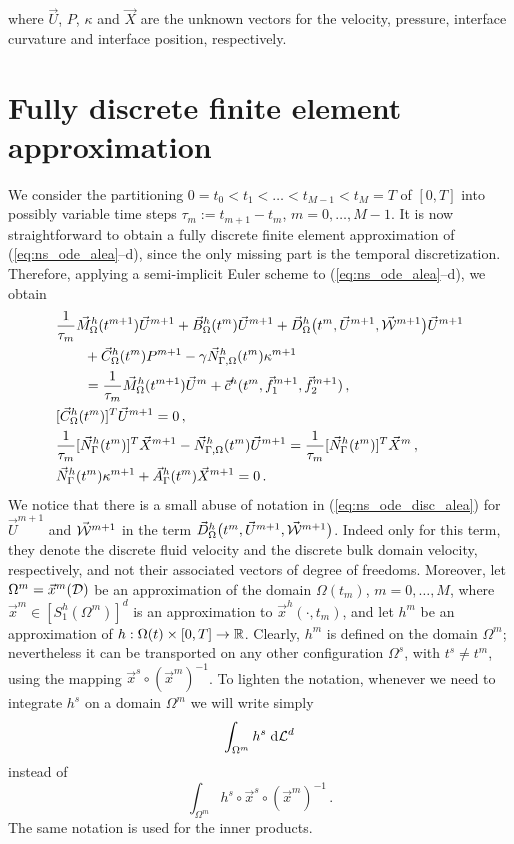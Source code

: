 where $\vec U$, $P$, $\kappa$ and $\vec X$ are the unknown vectors for the
velocity, pressure, interface curvature and interface position, respectively.

\section{Fully discrete finite element approximation}\label{sec:ale_fem}
We consider the partitioning  $0= t_0 < t_1 < \ldots < t_{M-1} < t_M = T$ of
$[0,T]$ into possibly variable time steps $\tau_m := t_{m+1}-t_m$, $m=0, \ldots,
M-1$. It is now straightforward to obtain a fully discrete finite element
approximation of (\ref{eq:ns_ode_alea}--d), since the only missing part is the
temporal discretization. Therefore, applying a semi-implicit Euler scheme to
(\ref{eq:ns_ode_alea}--d), we obtain
\begin{subequations}
\begin{align}
& \frac{1}{\tau_m}\vec M^h_\Omega(t^{m+1})\vec U^{m+1} +
\vec B^h_\Omega(t^m) \vec U^{m+1} +
\vec D^h_\Omega\big(t^m,\vec U^{m+1},\vec{\mathcal W}^{m+1}\big)\vec U^{m+1} \nonumber \\
& \qquad + \vec C^h_\Omega(t^m) P^{m+1}
- \gamma \vec{N}_{\Gamma,\Omega}^h(t^m) \kappa^{m+1} \nonumber \\
& \qquad = \frac{1}{\tau_m} \vec M^h_\Omega(t^{m+1})\vec U^m
+ \vec c^h(t^m,\vec f_1^{m+1},\vec f_2^{m+1})\,,\label{eq:ns_ode_disc_alea} \\
& [\vec C^h_\Omega(t^m) ]^T \vec U^{m+1} = 0\,,
\label{eq:ns_ode_disc_aleb} \\
& \frac{1}{\tau_m}[\vec N_\Gamma^h(t^m)]^T \vec X^{m+1}
- \vec{N}_{\Gamma,\Omega}^h(t^m)\vec U^{m+1} = \frac{1}{\tau_m}[\vec N_\Gamma^h(t^m)]^T
\vec X^m\,, \label{eq:ns_ode_disc_alec}\\
& \vec N_\Gamma^h(t^m) \kappa^{m+1} + \vec A^h_\Gamma(t^m)\vec X^{m+1}
 = 0\,. \label{eq:ns_ode_disc_aled}
\end{align}
\end{subequations}
We notice that there is a small abuse of notation in (\ref{eq:ns_ode_disc_alea})
for $\vec U^{m+1}$ and $\vec{\mathcal W}^{m+1}$ in the term $\vec D^h_\Omega\big(t^{m},\vec
U^{m+1},\vec{\mathcal W}^{m+1}\big)$. Indeed only for this term, they denote the discrete
fluid velocity and the discrete bulk domain velocity, respectively, and not
their associated vectors of degree of freedoms. Moreover, let
$\Omega^m=\vec x^m(\mathcal D)$ be an approximation of the domain $\Omega(t_m)$, $m=0
,\ldots, M$, where $\vec x^m \in [S^h_1(\Omega^m)]^d$ is an approximation to
$\vec x^h(\cdot,t_m)$, and let $h^m$ be an approximation of
$h:\Omega(t)\times[0,T]\to\mathbb R$. Clearly, $h^m$ is defined on the domain
$\Omega^m$; nevertheless it can be transported on any other configuration
$\Omega^s$, with $t^s\neq t^m$, using the mapping $\vec x^s\circ{(\vec
x^m)}^{-1}$. To lighten the notation, whenever we need to integrate
$h^s$ on a domain $\Omega^m$ we will write simply
\begin{equation*}
\int_{\Omega^m} h^s \;{\rm d}{\cal L}^{d}
\end{equation*}
instead of
\begin{equation*}
\int_{\Omega^m} h^s\circ \vec x^s\circ{(\vec x^m)}^{-1}\,.
\end{equation*}
The same notation is used for the inner products.


